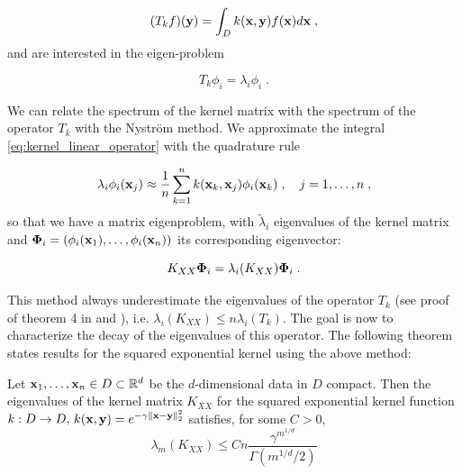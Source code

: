 \documentclass{article}
\begin{document}
\begin{equation} \label{eq:kernel_linear_operator}
    (T_k f)(\vect y) = \int_{D} k(\vect x, \vect y) f(\vect x)  d\vect x  \; ,%
\end{equation}
%
and are interested in the eigen-problem

\begin{equation*}
    T_k \phi_i = \lambda_i \phi_i \; .
\end{equation*}

We can relate the spectrum of the kernel matrix with the spectrum of the operator $T_k$ with the Nyström method. We approximate the integral \eqref{eq:kernel_linear_operator} with the quadrature rule

\begin{equation} \label{eq:nystrom}
    \lambda_i \phi_i(\boldsymbol{\mathbf{x}}_j) \approx \frac{1}{n} \sum_{k=1}^n k(\boldsymbol{\mathbf{x}}_k, \boldsymbol{\mathbf{x}}_j) \phi_i(\boldsymbol{\mathbf{x}}_k) \; , 
    \quad j = 1, \ldots, n \; ,
\end{equation}
%
so that we have a matrix eigenproblem, with $\tilde \lambda_i$ eigenvalues of the kernel matrix and $\boldsymbol{\mathbf{\Phi}}_i = (\phi_i(\boldsymbol{\mathbf{x}}_1), \ldots, \phi_i(\boldsymbol{\mathbf{x}}_n))$ its corresponding eigenvector:

\begin{equation*}
    K_{XX} \boldsymbol{\mathbf{\Phi}}_i = \lambda_i(K_{XX}) \boldsymbol{\mathbf{\Phi}}_i \; .
\end{equation*}

This method always underestimate the eigenvalues of the operator $T_k$ (see proof of theorem 4 in \cite{banerjee_parallel_2013} and \cite{baker_numerical_1977}), i.e. $ \lambda_i(K_{XX}) \le n \lambda_i(T_k)$. The goal is now to characterize the decay of the eigenvalues of this operator. The following theorem states results for the squared exponential kernel using the above method:

\begin{theorem}
Let $\boldsymbol{\mathbf{x}}_1, \ldots, \boldsymbol{\mathbf{x}}_n \in D \subset \mathbb R^d$ be the $d$-dimensional data in $D$ compact. Then the eigenvalues of the kernel matrix $K_{XX}$ for the squared exponential kernel function $k: D \to D, \, k(\boldsymbol{\mathbf{x}}, \boldsymbol{\mathbf{y}}) = e^{-\gamma \Vert \boldsymbol{\mathbf{x}} - \boldsymbol{\mathbf{y}} \Vert_2^2}$ satisfies, for some $C > 0$,
\begin{equation*}
    \lambda_m(K_{XX}) \le C n \frac{\gamma^{m^{1/d}}}{\Gamma(m^{1/d}/2)}
\end{equation*}
\end{theorem}
\end{document}
